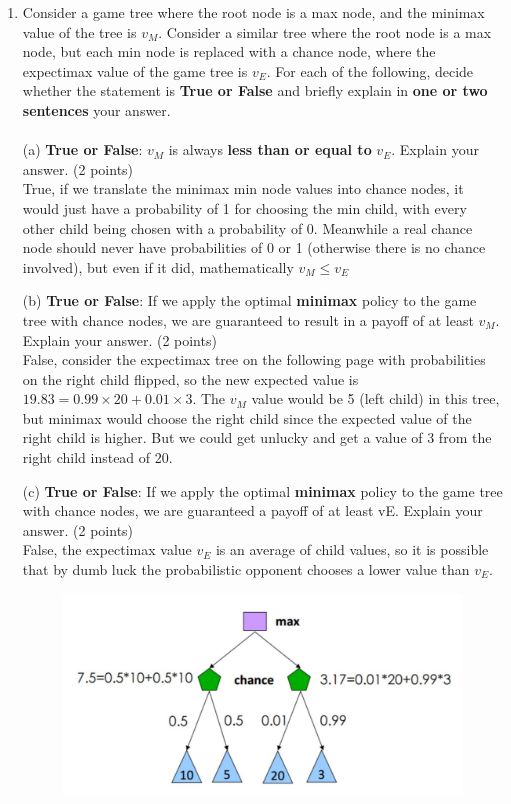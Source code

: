 \documentclass{article}
\begin{document}
\begin{enumerate}
	\item Consider a game tree where the root node is a max node, and the minimax value of the tree is $v_M$. Consider a similar tree where the root node is a max node, but each min node is replaced with a	chance node, where the expectimax value of the game tree is $v_E$. For each of the following, decide whether the statement is \textbf{True or False} and briefly explain in \textbf{one or two sentences} your answer.\\~\\
	(a) \textbf{True or False}: $v_M$ is always \textbf{less than or equal to} $v_E$. Explain your answer. (2 points)\\
	True, if we translate the minimax min node values into chance nodes, it would just have a probability of 1 for choosing the min child, with every other child being chosen with a probability of 0. Meanwhile a real chance node should never have probabilities of 0 or 1 (otherwise there is no chance involved), but even if it did, mathematically $v_M\le v_E$
	
	(b) \textbf{True or False}: If we apply the optimal \textbf{minimax} policy to the game tree with chance nodes, we are guaranteed to result in a payoff of at least $v_M$. Explain your answer. (2 points)\\
	False, consider the expectimax tree on the following page with probabilities on the right child flipped, so the new expected value is $19.83 = 0.99\times 20 + 0.01\times 3$. The $v_M$ value would be 5 (left child) in this tree, but minimax would choose the right child since the expected value of the right child is higher. But we could get unlucky and get a value of 3 from the right child instead of 20.
	
	(c) \textbf{True or False}: If we apply the optimal \textbf{minimax} policy to the game tree with chance nodes, we are guaranteed a payoff of at least vE. Explain your answer. (2 points)\\
	False, the expectimax value $v_E$ is an average of child values, so it is possible that by dumb luck the probabilistic opponent chooses a lower value than $v_E$.
	
	\begin{figure}[h]
		\centering\includegraphics[width=\textwidth]{Expectimax.jpg}
	\end{figure}
\end{enumerate}\label{end}
\end{document}
